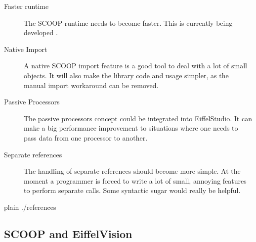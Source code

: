 \documentclass[a4paper,10pt]{article}
\begin{document}
\begin{description}
 \item [Faster runtime] The SCOOP runtime needs to become faster. 
 This is currently being developed \cite{thesis:scottwest}.
 \item [Native Import] A native SCOOP import feature is a good tool to deal with a lot of small objects.
 It will also make the library code and usage simpler, as the manual import workaround can be removed.
 \item [Passive Processors] The passive processors concept \cite{paper:passive-processors} could be integrated into EiffelStudio.
 It can make a big performance improvement to situations where one needs to pass data from one processor to another.
 \item [Separate references] The handling of separate references should become more simple.
 At the moment a programmer is forced to write a lot of small, annoying features to perform separate calls.
 Some syntactic sugar would really be helpful.
\end{description}


\begin{flushleft}
{{{
 {plain}
 {./references}
}}}
\end{flushleft}


\begin{appendices}
% 

\section{SCOOP and EiffelVision}
\end{appendices}

\todos
\end{document}

